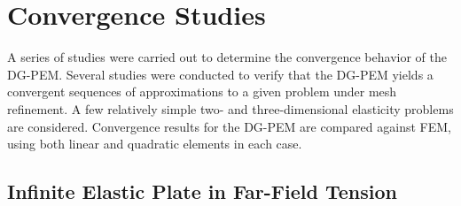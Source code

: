 

\section{Convergence Studies}

A series of studies were carried out to determine the convergence behavior of the DG-PEM. Several studies were conducted to verify that the DG-PEM yields a convergent sequences of approximations to a given problem under mesh refinement. A few relatively simple two- and three-dimensional elasticity problems are considered. Convergence results for the DG-PEM are compared against FEM, using both linear and quadratic elements in each case.

\subsection*{Infinite Elastic Plate in Far-Field Tension}

